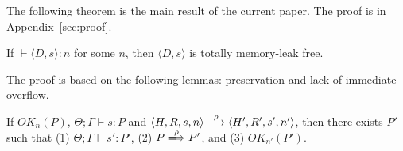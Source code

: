 
The following theorem is the main result of the current paper.  The
proof is in Appendix~\ref{sec:proof}.

\begin{theorem}\label{thm1}
If $\vdash \langle D, s \rangle : n$ for some \(n\), then \(\langle D,
s \rangle\) is totally memory-leak free.
\end{theorem}


The proof is based on the following lemmas: preservation and lack of
immediate overflow.

\begin{lemma}[Preservation]
\label{lem:preservation}
If $OK_{n}(P)$, $\Theta; \Gamma \vdash s : P$ and $\langle H,R,s,n
\rangle \xlongrightarrow{\rho} \langle H',R',s', n' \rangle$, then
there exists $P'$ such that (1) $ \Theta; \Gamma \vdash s' : P'$, (2)
\(P \xLongrightarrow{\rho} P'\), and (3) \(OK_{n'}(P')\).
\end{lemma}


